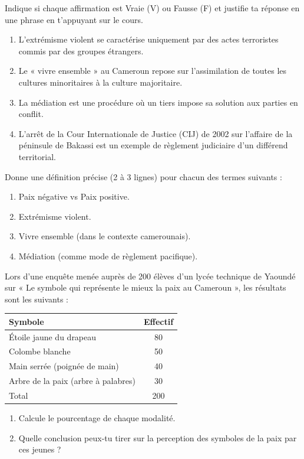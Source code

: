 \documentclass[11pt]{article}
\begin{document}
\begin{exercice}
Indique si chaque affirmation est Vraie (V) ou Fausse (F) et justifie ta réponse en une phrase en t'appuyant sur le cours.
\begin{enumerate}
\item L'extrémisme violent se caractérise uniquement par des actes terroristes commis par des groupes étrangers.
\item Le « vivre ensemble » au Cameroun repose sur l'assimilation de toutes les cultures minoritaires à la culture majoritaire.
\item La médiation est une procédure où un tiers impose sa solution aux parties en conflit.
\item L'arrêt de la Cour Internationale de Justice (CIJ) de 2002 sur l'affaire de la péninsule de Bakassi est un exemple de règlement judiciaire d'un différend territorial.
\end{enumerate}
\end{exercice}

\begin{exercice}
Donne une définition précise (2 à 3 lignes) pour chacun des termes suivants :
\begin{enumerate}
\item Paix négative vs Paix positive.
\item Extrémisme violent.
\item Vivre ensemble (dans le contexte camerounais).
\item Médiation (comme mode de règlement pacifique).
\end{enumerate}
\end{exercice}

\begin{exercice}
Lors d'une enquête menée auprès de 200 élèves d'un lycée technique de Yaoundé sur « Le symbole qui représente le mieux la paix au Cameroun », les résultats sont les suivants :
\begin{center}
\begin{tabular}{|l|c|}
\hline
Symbole & Effectif \\
\hline
Étoile jaune du drapeau & 80 \\
Colombe blanche & 50 \\
Main serrée (poignée de main) & 40 \\
Arbre de la paix (arbre à palabres) & 30 \\
\hline
Total & 200 \\
\hline
\end{tabular}
\end{center}
\begin{enumerate}
\item Calcule le pourcentage de chaque modalité.
\item Quelle conclusion peux-tu tirer sur la perception des symboles de la paix par ces jeunes ?
\end{enumerate}
\end{exercice}
\end{document}
